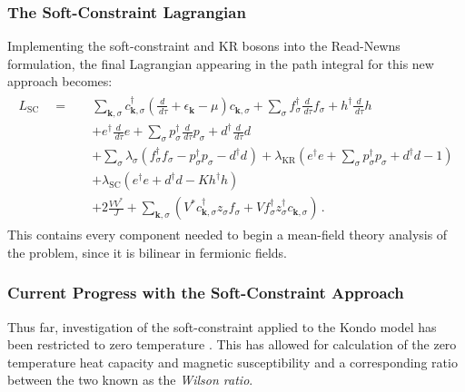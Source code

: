 \subsubsection{The Soft-Constraint Lagrangian}

Implementing the soft-constraint and KR bosons into the Read-Newns formulation, the final Lagrangian appearing in the path integral for this new approach becomes:
\begin{align}
\begin{split}
L_{\text{SC}} \quad = \quad &\sum_{\boldsymbol{k},\sigma} c^{\dagger}_{\boldsymbol{k},\sigma} \left( \frac{d}{\,d\tau} + \epsilon^{}_{\boldsymbol{k}} - \mu \right) c^{}_{\boldsymbol{k},\sigma} + \sum_{\sigma} f^{\dagger}_{\sigma} \frac{d}{\,d\tau} f^{}_{\sigma} + h^{\dagger} \frac{d}{\,d\tau}h \\
&+ e^{\dagger} \frac{d}{\,d\tau} e  + \sum_{\sigma} p^{\dagger}_{\sigma} \frac{d}{\,d\tau} p^{}_{\sigma} + d^{\dagger} \frac{d}{\,d\tau} d\\
&+ \sum_{\sigma} \lambda^{}_{\sigma} (f^{\dagger}_{\sigma} f^{}_{\sigma} - p^{\dagger}_{\sigma} p^{}_{\sigma} - d^{\dagger} d^{} ) + \lambda_{\text{KR}} ( e^{\dagger} e + \sum_{\sigma} p^{\dagger}_{\sigma} p^{}_{\sigma} + d^{\dagger} d - 1)\\
&+\lambda_{\text{SC}} ( e^{\dagger} e + d^{\dagger} d - K h^{\dagger} h)\\
&+ 2 \frac{V V^{\ast}}{J} + \sum_{\boldsymbol{k},\sigma} \left( V^{\ast} c^{\dagger}_{\boldsymbol{k},\sigma} z^{}_{\sigma} f^{}_{\sigma} + V f^{\dagger}_{\sigma} z^{\dagger}_{\sigma} c^{}_{\boldsymbol{k},\sigma} \right) \,.
\label{eq:Lagrangian}
\end{split}
\end{align}
This contains every component needed to begin a mean-field theory analysis of the problem, since it is bilinear in fermionic fields.

\subsubsection{Current Progress with the Soft-Constraint Approach}

Thus far, investigation of the soft-constraint applied to the Kondo model has been restricted to zero temperature \cite{Draft}. This has allowed for calculation of the zero temperature heat capacity and magnetic susceptibility and a corresponding ratio between the two known as the \emph{Wilson ratio}.

